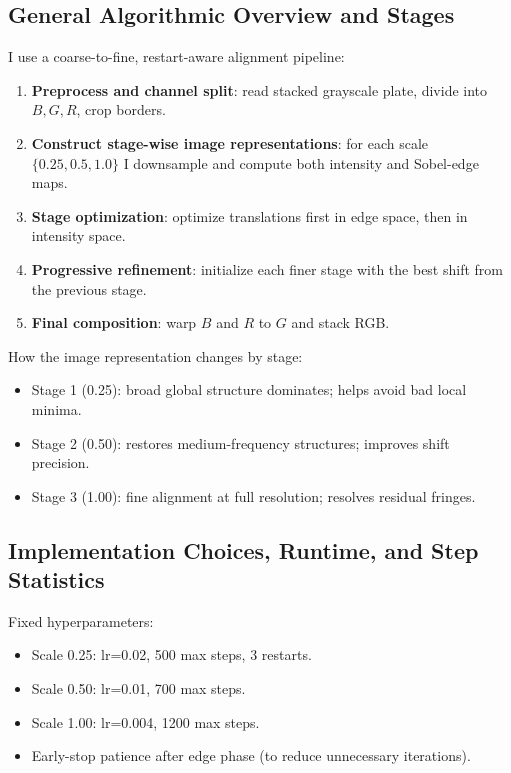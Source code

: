 {\subsection*{General Algorithmic Overview and Stages}
\label{sec:p1-overview}
I use a coarse-to-fine, restart-aware alignment pipeline:
\begin{enumerate}
\item \textbf{Preprocess and channel split}: read stacked grayscale plate, divide into $B,G,R$, crop borders.
\item \textbf{Construct stage-wise image representations}: for each scale $\{0.25,0.5,1.0\}$ I downsample and compute both intensity and Sobel-edge maps.
\item \textbf{Stage optimization}: optimize translations first in edge space, then in intensity space.
\item \textbf{Progressive refinement}: initialize each finer stage with the best shift from the previous stage.
\item \textbf{Final composition}: warp $B$ and $R$ to $G$ and stack RGB.
\end{enumerate}

How the image representation changes by stage:
\begin{itemize}
\item Stage 1 (0.25): broad global structure dominates; helps avoid bad local minima.
\item Stage 2 (0.50): restores medium-frequency structures; improves shift precision.
\item Stage 3 (1.00): fine alignment at full resolution; resolves residual fringes.
\end{itemize}

\subsection*{Implementation Choices, Runtime, and Step Statistics}
\label{sec:p1-impl}
Fixed hyperparameters:
\begin{itemize}
\item Scale 0.25: lr=0.02, 500 max steps, 3 restarts.
\item Scale 0.50: lr=0.01, 700 max steps.
\item Scale 1.00: lr=0.004, 1200 max steps.
\item Early-stop patience after edge phase (to reduce unnecessary iterations).
\end{itemize}

}
